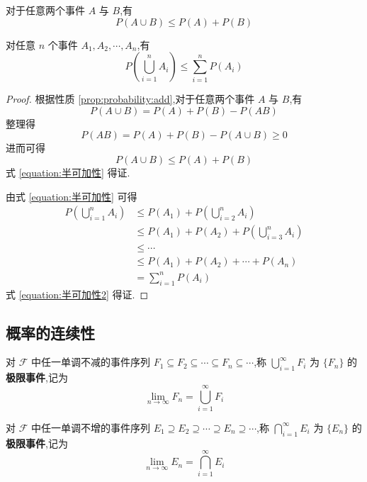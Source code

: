 \begin{corollary}[][半可加性]
    \indent 对于任意两个事件 $A$ 与 $B$,有
    \begin{equation} \label{equation:半可加性}
        P(A \cup B) \leqslant P(A) + P(B)
    \end{equation}

    对任意 $n$ 个事件 $A_1,A_2,\cdots,A_n$,有
    \begin{equation} \label{equation:半可加性2}
        P \left(\bigcup_{i=1}^n A_i \right) \leqslant \sum_{i=1}^n P(A_i)
    \end{equation}
\end{corollary}

\begin{proof}
    根据性质 \ref{prop:probability:add},对于任意两个事件 $A$ 与 $B$,有
    $$
    P(A \cup B) = P(A) + P(B) - P(AB)
    $$
    整理得
    $$
    P(AB) = P(A) + P(B) - P(A \cup B) \geqslant 0
    $$
    进而可得
    $$
    P(A \cup B) \leqslant P(A) + P(B)
    $$
    式 \eqref{equation:半可加性} 得证.

    由式 \eqref{equation:半可加性} 可得
    $$
    \begin{aligned}
        P \left(\bigcup_{i=1}^n A_i \right) & \leqslant P(A_1) + P \left(\bigcup_{i=2}^n A_i \right) \\
        & \leqslant P(A_1) + P(A_2) + P \left(\bigcup_{i=3}^n A_i \right) \\
        & \leqslant \cdots \\
        & \leqslant P(A_1) + P(A_2) + \cdots + P(A_n) \\
        &= \sum_{i=1}^n P(A_i)
    \end{aligned}
    $$
    式 \eqref{equation:半可加性2} 得证.
\end{proof}

\subsection{概率的连续性}

\begin{definition}
    \indent 对 $\mathcal{F}$ 中任一单调不减的事件序列 $F_1 \subseteq F_2 \subseteq \cdots \subseteq F_n \subseteq \cdots$,称 $\displaystyle\bigcup_{i=1}^{\infty} F_i$ 为 $\{F_n\}$ 的\textbf{极限事件},记为
    $$
    \lim_{n \to \infty} F_n = \bigcup_{i=1}^{\infty} F_i
    $$

    对 $\mathcal{F}$ 中任一单调不增的事件序列 $E_1 \supseteq E_2 \supseteq \cdots \supseteq E_n \supseteq \cdots$,称 $\displaystyle\bigcap_{i=1}^{\infty} E_i$ 为 $\{E_n\}$ 的\textbf{极限事件},记为
    $$
    \lim_{n \to \infty} E_n = \bigcap_{i=1}^{\infty} E_i
    $$
\end{definition}

